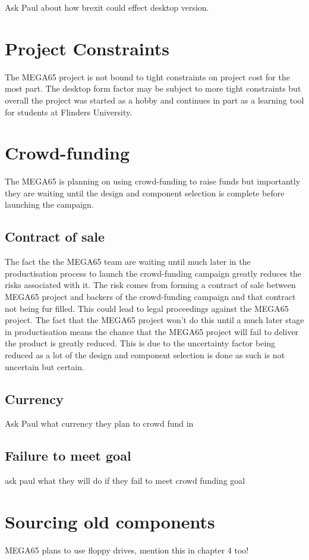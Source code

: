 Ask Paul about how brexit could effect desktop version.


\section{Project Constraints}
The MEGA65 project is not bound to tight constraints on project cost for the most part. The desktop form factor may be subject to more tight constraints but overall the project was started as a hobby and continues in part as a learning tool for students at Flinders University.


\section{Crowd-funding}
The MEGA65 is planning on using crowd-funding to raise funds but importantly they are waiting until the design and component selection is complete before launching the campaign.


\subsection{Contract of sale}
The fact the the MEGA65 team are waiting until much later in the productisation process to launch the crowd-funding campaign greatly reduces the risks associated with it. The risk comes from forming a contract of sale between MEGA65 project and backers of the crowd-funding campaign and that contract not being fur filled. This could lead to legal proceedings against the MEGA65 project. The fact that the MEGA65 project won't do this until a much later stage in productisation means the chance that the MEGA65 project will fail to deliver the product is greatly reduced. This is due to the uncertainty factor being reduced as a lot of the design and component selection is done as such is not uncertain but certain.


\subsection{Currency}
Ask Paul what currency they plan to crowd fund in


\subsection{Failure to meet goal}
ask paul what they will do if they fail to meet crowd funding goal


\section{Sourcing old components}
MEGA65 plans to use floppy drives, mention this in chapter 4 too!


